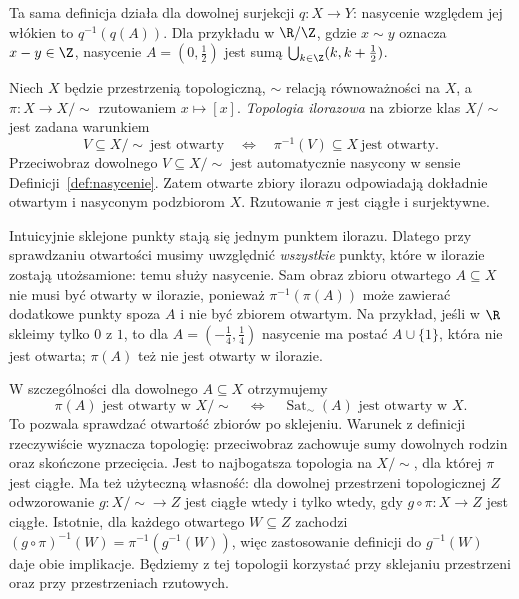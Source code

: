 Ta sama definicja działa dla dowolnej surjekcji
$q\colon X\to Y$: nasycenie względem jej włókien to
$q^{-1}(q(A))$. Dla przykładu w $\R/{\Z}$, gdzie
$x\sim y$ oznacza $x-y\in\Z$, nasycenie
$A=(0,\tfrac12)$ jest sumą
$\bigcup_{k\in\Z}(k,k+\tfrac12)$.

\begin{definicja}\label{def:topologia-ilorazowa}
Niech $X$ będzie przestrzenią topologiczną, $\sim$ relacją równoważności
na $X$, a $\pi\colon X\to X/{\sim}$ rzutowaniem
$x\mapsto[x]$. \emph{Topologia ilorazowa} na zbiorze klas $X/{\sim}$
jest zadana warunkiem
\[
 V\subseteq X/{\sim}\ \text{jest otwarty}
 \quad\Longleftrightarrow\quad
 \pi^{-1}(V)\subseteq X\ \text{jest otwarty}.
\]
Przeciwobraz dowolnego $V\subseteq X/{\sim}$ jest
automatycznie nasycony w sensie
Definicji~\ref{def:nasycenie}. Zatem otwarte zbiory
ilorazu odpowiadają dokładnie otwartym
i nasyconym podzbiorom $X$.
Rzutowanie $\pi$ jest ciągłe i surjektywne.
\end{definicja}

Intuicyjnie sklejone punkty stają się jednym punktem ilorazu.
Dlatego przy sprawdzaniu otwartości musimy uwzględnić
\emph{wszystkie} punkty, które w ilorazie zostają utożsamione:
temu służy nasycenie. Sam obraz zbioru otwartego
$A\subseteq X$ nie musi być otwarty w ilorazie,
ponieważ $\pi^{-1}(\pi(A))$ może zawierać dodatkowe
punkty spoza $A$ i nie być zbiorem otwartym.
Na przykład, jeśli w $\R$ skleimy tylko $0$ z $1$,
to dla $A=(-\tfrac14,\tfrac14)$ nasycenie ma postać
$A\cup\{1\}$, która nie jest otwarta; $\pi(A)$ też
nie jest otwarty w ilorazie.

W szczególności dla dowolnego $A\subseteq X$ otrzymujemy
\[
 \pi(A)\text{ jest otwarty w }X/{\sim}
 \quad\Longleftrightarrow\quad
 \operatorname{Sat}_{\sim}(A)\text{ jest otwarty w }X.
\]
To pozwala sprawdzać otwartość zbiorów po sklejeniu.
Warunek z definicji rzeczywiście wyznacza topologię: przeciwobraz
zachowuje sumy dowolnych rodzin oraz skończone przecięcia.
Jest to najbogatsza topologia na $X/{\sim}$, dla której $\pi$ jest
ciągłe. Ma też użyteczną własność: dla dowolnej przestrzeni
topologicznej $Z$ odwzorowanie $g\colon X/{\sim}\to Z$ jest ciągłe
wtedy i tylko wtedy, gdy $g\circ\pi\colon X\to Z$ jest ciągłe.
Istotnie, dla każdego otwartego $W\subseteq Z$ zachodzi
$(g\circ\pi)^{-1}(W)=\pi^{-1}(g^{-1}(W))$, więc zastosowanie definicji
do $g^{-1}(W)$ daje obie implikacje. Będziemy z tej topologii
korzystać przy sklejaniu przestrzeni oraz przy przestrzeniach
rzutowych.

